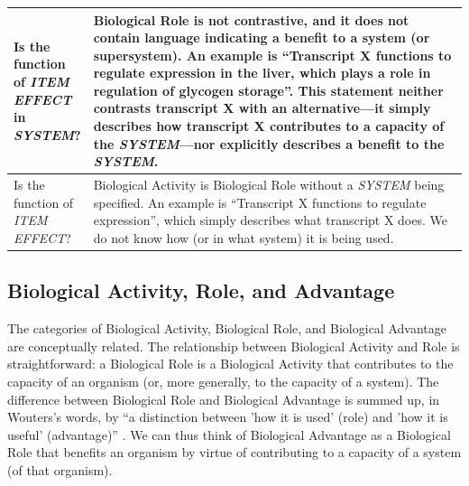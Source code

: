 \documentclass{article}
\begin{document}
\begin{landscape}
\begin{table}
\begin{tabular}{|p{0.17\linewidth}|p{0.97\linewidth}|}
    \hline
    Is the function of \emph{ITEM} \emph{EFFECT} in \emph{SYSTEM}? &  Biological Role is not contrastive, and it does not contain language indicating a benefit to a system (or supersystem). An example is ``Transcript X functions to regulate expression in the liver, which plays a role in regulation of glycogen storage''. This statement neither contrasts transcript X with an alternative---it simply describes how transcript X contributes to a capacity of the \emph{SYSTEM}---nor explicitly describes a benefit to the \emph{SYSTEM}.  \\
    \hline
    Is the function of \emph{ITEM} \emph{EFFECT}? &  Biological Activity is Biological Role without a \emph{SYSTEM} being specified. An example is ``Transcript X functions to regulate expression'', which simply describes what transcript X does. We do not know how (or in what system) it is being used. \\
    \hline
  \end{tabular}
  \label{tab:flowchart}
\end{table}
\end{landscape}

\subsection{Biological Activity, Role, and Advantage}
\label{sec:relat-betw-funct}

The categories of Biological Activity, Biological Role, and Biological Advantage are conceptually related.
The relationship between Biological Activity and Role is straightforward: a Biological Role is a Biological Activity that contributes to the capacity of an organism (or, more generally, to the capacity of a system). 
The difference between Biological Role and Biological Advantage is summed up, in Wouters's words, by ``a distinction between 'how it is used' (role) and 'how it is useful' (advantage)'' \cite{wouters2003} .
We can thus think of Biological Advantage as a Biological Role that benefits an organism by virtue of contributing to a capacity of a system (of that organism).
\end{document}
